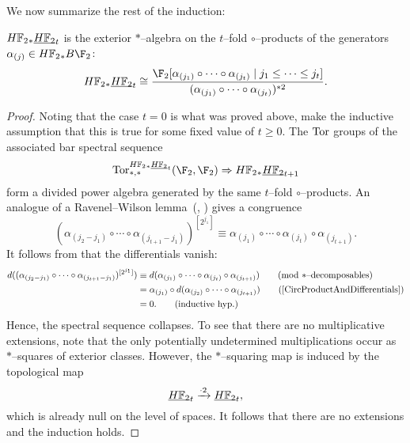 We now summarize the rest of the induction:
\begin{theorem}\label{UnstableSteenrodInduction}
\(\HFtwo_* \OS{\HFtwo}{t}\) is the exterior \(\ast\)--algebra on the \(t\)--fold \(\circ\)--products of the generators \(\alpha_{(j)} \in \HFtwo_* B\F_2\): \[\HFtwo_* \OS{\HFtwo}{t} \cong \frac{\F_2[\alpha_{(j_1)} \circ \cdots \circ \alpha_{(j_t)} \mid j_1 \le \cdots \le j_t]}{(\alpha_{(j_1)} \circ \cdots \circ \alpha_{(j_t)})^{\ast 2}}.\]
\end{theorem}
\begin{proof}
Noting that the case \(t = 0\) is what was proved above, make the inductive assumption that this is true for some fixed value of \(t \ge 0\).  The \(\operatorname{Tor}\) groups of the associated bar spectral sequence \[\Tor^{\HFtwo_* \OS{\HFtwo}{t}}_{*, *}(\F_2, \F_2) \Rightarrow \HFtwo_* \OS{\HFtwo}{t+1}\] form a divided power algebra generated by the same \(t\)--fold \(\circ\)--products.  An analogue of a Ravenel--Wilson lemma~(\cite[Lemma 9.5]{RavenelWilsonKthyOfEMSpaces}, \cite[Claim 8.16]{Wilson}) gives a congruence \[(\alpha_{(j_2-j_1)} \circ \cdots \circ \alpha_{(j_{t+1}-j_1)})^{[2^{j_1}]} \equiv \alpha_{(j_1)} \circ \cdots \circ \alpha_{(j_t)} \circ \alpha_{(j_{t+1})} \tag{mod \(\ast\)--decomposables}.\]  It follows from  that the differentials vanish:
\begin{align*}
d((\alpha_{(j_2-j_1)} \circ \cdots \circ \alpha_{(j_{t+1}-j_1)})^{[2^{j_1}]}) & \equiv d(\alpha_{(j_1)} \circ \cdots \circ \alpha_{(j_t)} \circ \alpha_{(j_{t+1})}) \tag{mod \(\ast\)--decomposables} \\
& = \alpha_{(j_1)} \circ d(\alpha_{(j_2)} \circ \cdots \circ \alpha_{(j_{t+1})}) \tag{\Cref{CircProductAndDifferentials}} \\
& = 0. \tag{inductive hyp.}
\end{align*}
Hence, the spectral sequence collapses.  To see that there are no multiplicative extensions, note that the only potentially undetermined multiplications occur as \(\ast\)--squares of exterior classes.  However, the \(\ast\)--squaring map is induced by the topological map \[\OS{\HFtwo}{t} \xrightarrow{\cdot 2} \OS{\HFtwo}{t},\] which is already null on the level of spaces.  It follows that there are no extensions and the induction holds.
\end{proof}

